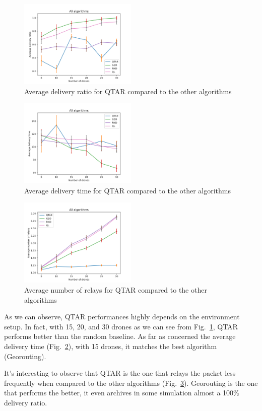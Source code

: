 \begin{figure}[h]
    \centering
    \includegraphics[width=0.5\textwidth]{../plots/average_delivery_ratio.png}
    \caption{Average delivery ratio for QTAR compared to the other algorithms}\label{fig:average_delivery_ratio}
\end{figure}

\begin{figure}[h]
    \centering
    \includegraphics[width=0.5\textwidth]{../plots/average_delivery_time.png}
    \caption{Average delivery time for QTAR compared to the other algorithms}\label{fig:average_delivery_time}
\end{figure}

\begin{figure}[h]
    \centering
    \includegraphics[width=0.5\textwidth]{../plots/average_number_of_relays.png}
    \caption{Average number of relays for QTAR compared to the other algorithms}\label{fig:average_number_of_relays}
\end{figure}

As we can observe, QTAR performances highly depends on the environment setup. In fact, with 15, 20, and 30 drones as we can see from Fig.~\ref{fig:average_delivery_ratio}, QTAR performs better than the random baseline.
As far as concerned the average delivery time (Fig.~\ref{fig:average_delivery_time}), with 15 drones, it matches the best algorithm (Georouting).

It's interesting to observe that QTAR is the one that relays the packet less frequently when compared to the other algorithms (Fig.~\ref{fig:average_number_of_relays}).
Georouting is the one that performs the better, it even archives in some simulation almost a 100\% delivery ratio.